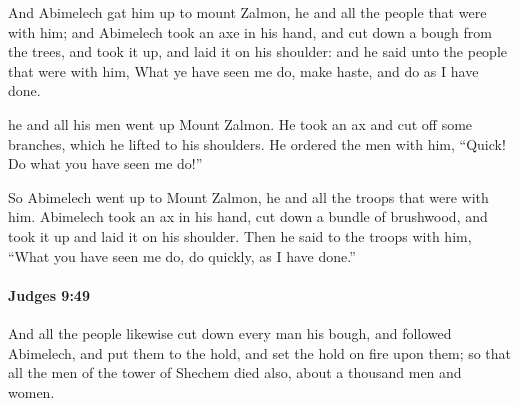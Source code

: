 			\begin{versebox}
					\item[BHS] 
					\item[ASV] And Abimelech gat him up to mount Zalmon, he and all the people that were with him; and Abimelech took an axe in his hand, and cut down a bough from the trees, and took it up, and laid it on his shoulder: and he said unto the people that were with him, What ye have seen me do, make haste, and do as I have done.
					\item[NIV] he and all his men went up Mount Zalmon. He took an ax and cut off some branches, which he lifted to his shoulders. He ordered the men with him, “Quick! Do what you have seen me do!”
					\item[NRSV] So Abimelech went up to Mount Zalmon, he and all the troops that were with him. Abimelech took an ax in his hand, cut down a bundle of brushwood, and took it up and laid it on his shoulder. Then he said to the troops with him, “What you have seen me do, do quickly, as I have done.”
			\end{versebox}

		\paragraph{Judges 9:49} %
			\label{JUDGES-9-49}

			And all the people likewise cut down every man his bough, and followed Abimelech, and put them to the hold, and set the hold on fire upon them; so that all the men of the tower of Shechem died also, about a thousand men and women.

